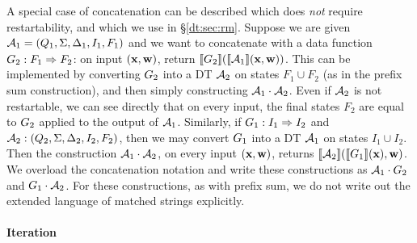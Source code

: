 A special case of concatenation can be described which does \emph{not} require restartability, and which we use in \S\ref{dt:sec:rm}. Suppose we are given $\mathcal{A}_1 = (Q_{1}, \Sigma, \Delta_{1}, I_{1}, F_{1})$ and we want to concatenate with a data function $G_2: F_1 \Rightarrow F_2$: on input $(\textbf{x}, \textbf{w})$, return $\llbracket G_2 \rrbracket(\llbracket \mathcal{A}_1 \rrbracket(\textbf{x},\textbf{w}))$. This can be implemented by converting $G_2$ into a DT $\mathcal{A}_2$ on states $F_1 \cup F_2$ (as in the prefix sum construction), and then simply constructing $\mathcal{A}_1 \cdot \mathcal{A}_2$. Even if $\mathcal{A}_2$ is not restartable, we can see directly that on every input, the final states $F_2$ are equal to $G_2$ applied to the output of $\mathcal{A}_1$.
Similarly, if $G_1: I_1 \Rightarrow I_2$ and $\mathcal{A}_2: (Q_{2}, \Sigma, \Delta_{2}, I_{2}, F_{2})$, then we may convert $G_1$ into a DT $\mathcal{A}_1$ on states $I_1 \cup I_2$. Then the construction $\mathcal{A}_1 \cdot \mathcal{A}_2$, on every input $(\textbf{x},\textbf{w})$, returns $\llbracket \mathcal{A}_2 \rrbracket(\llbracket G_1 \rrbracket(\textbf{x}),\textbf{w})$.
We overload the concatenation notation and write these constructions as $\mathcal{A}_1 \cdot G_2$ and $G_1 \cdot \mathcal{A}_2$. For these constructions, as with prefix sum, we do not write out the extended language of matched strings explicitly.

\begin{figure*}[h]

\label{dt:fig:concatenation-with-DF}
\end{figure*}

\paragraph*{Iteration}

